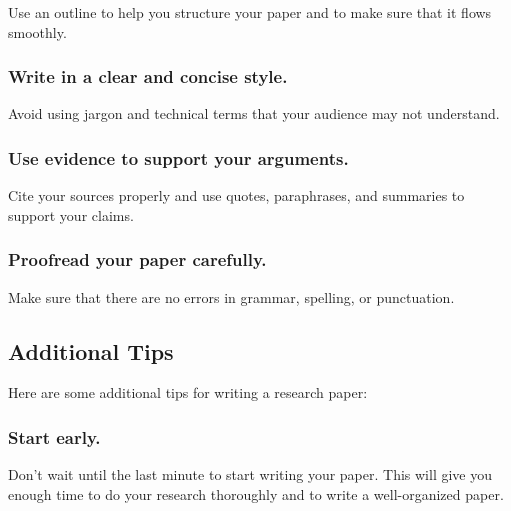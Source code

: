 \documentclass[
  b5paper]{book}
\begin{document}
Use an outline to help you structure your paper and to make sure that it flows smoothly.

\hypertarget{write-in-a-clear-and-concise-style.}{%
\subsubsection*{Write in a clear and concise style.}\label{write-in-a-clear-and-concise-style.}}

Avoid using jargon and technical terms that your audience may not understand.

\hypertarget{use-evidence-to-support-your-arguments.}{%
\subsubsection*{Use evidence to support your arguments.}\label{use-evidence-to-support-your-arguments.}}

Cite your sources properly and use quotes, paraphrases, and summaries to support your claims.

\hypertarget{proofread-your-paper-carefully.}{%
\subsubsection*{Proofread your paper carefully.}\label{proofread-your-paper-carefully.}}

Make sure that there are no errors in grammar, spelling, or punctuation.

\hypertarget{additional-tips-1}{%
\subsection*{Additional Tips}\label{additional-tips-1}}

Here are some additional tips for writing a research paper:

\hypertarget{start-early.}{%
\subsubsection*{Start early.}\label{start-early.}}

Don't wait until the last minute to start writing your paper. This will give you enough time to do your research thoroughly and to write a well-organized paper.
\end{document}
